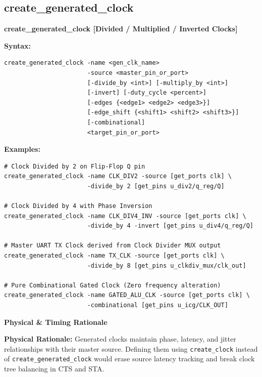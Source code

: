 \documentclass[11pt,a4paper]{article}
\newenvironment{cmdbox}[2]{%
  \begin{mdframed}[style=cmdstyle]%
  {\bfseries\sffamily\color{primary}#1 \hfill \footnotesize\color{mutedgray}[#2]}\par\vspace{3pt}%
}{%
  \end{mdframed}%
}
\newenvironment{physbox}{%
  \begin{mdframed}[style=physstyle]%
  {\bfseries\sffamily\color{darktext}\small Physical \& Timing Rationale}\par\vspace{2pt}\small%
}{%
  \end{mdframed}%
}
\begin{document}
\subsection{create\_generated\_clock}
\begin{cmdbox}{create\_generated\_clock}{Divided / Multiplied / Inverted Clocks}
\textbf{Syntax:}
\begin{lstlisting}[style=sdcstyle]
create_generated_clock -name <gen_clk_name> 
                       -source <master_pin_or_port> 
                       [-divide_by <int>] [-multiply_by <int>] 
                       [-invert] [-duty_cycle <percent>]
                       [-edges {<edge1> <edge2> <edge3>}]
                       [-edge_shift {<shift1> <shift2> <shift3>}]
                       [-combinational]
                       <target_pin_or_port>
\end{lstlisting}
\textbf{Examples:}
\begin{lstlisting}[style=sdcstyle]
# Clock Divided by 2 on Flip-Flop Q pin
create_generated_clock -name CLK_DIV2 -source [get_ports clk] \
                       -divide_by 2 [get_pins u_div2/q_reg/Q]

# Clock Divided by 4 with Phase Inversion
create_generated_clock -name CLK_DIV4_INV -source [get_ports clk] \
                       -divide_by 4 -invert [get_pins u_div4/q_reg/Q]

# Master UART TX Clock derived from Clock Divider MUX output
create_generated_clock -name TX_CLK -source [get_ports clk] \
                       -divide_by 8 [get_pins u_clkdiv_mux/clk_out]

# Pure Combinational Gated Clock (Zero frequency alteration)
create_generated_clock -name GATED_ALU_CLK -source [get_ports clk] \
                       -combinational [get_pins u_icg/CLK_OUT]
\end{lstlisting}
\end{cmdbox}

\begin{physbox}
\textbf{Physical Rationale:} Generated clocks maintain phase, latency, and jitter relationships with their master source. Defining them using \texttt{create\_clock} instead of \texttt{create\_generated\_clock} would erase source latency tracking and break clock tree balancing in CTS and STA.
\end{physbox}
\end{document}
